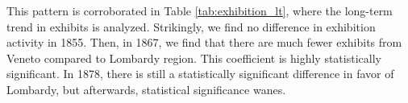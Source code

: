 This pattern is corroborated in Table \ref{tab:exhibition_lt}, where the long-term trend in exhibits is analyzed. 
Strikingly, we find no difference in exhibition activity in 1855. 
Then, in 1867, we find that there are much fewer exhibits from  Veneto compared to Lombardy region. 
This coefficient is highly statistically significant. 
In 1878, there is still a statistically significant difference in favor of Lombardy, but afterwards, statistical significance wanes. 

\begin{center}
    
    
\end{center}






